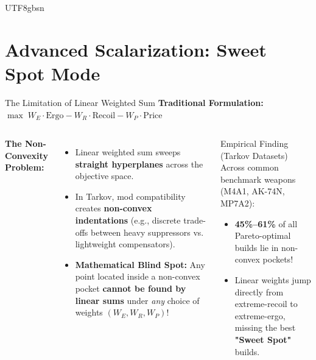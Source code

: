 \documentclass[aspectratio=169]{beamer}
\begin{document}
\begin{CJK*}{UTF8}{gbsn}


\section{Advanced Scalarization: Sweet Spot Mode}

\begin{frame}{The Limitation of Linear Weighted Sum}
    \textbf{Traditional Formulation:} $\max \; W_E \cdot \text{Ergo} - W_R \cdot \text{Recoil} - W_P \cdot \text{Price}$
    
    \vspace{0.3cm}
    \begin{columns}
        \textbf{The Non-Convexity Problem:}
        \begin{itemize}
            \item Linear weighted sum sweeps \textbf{straight hyperplanes} across the objective space.
            \item In Tarkov, mod compatibility creates \textbf{non-convex indentations} (e.g., discrete trade-offs between heavy suppressors vs. lightweight compensators).
            \item \textbf{Mathematical Blind Spot:} Any point located inside a non-convex pocket \textbf{cannot be found by linear sums} under \textit{any} choice of weights $(W_E, W_R, W_P)$!
        \end{itemize}

        \begin{block}{Empirical Finding (Tarkov Datasets)}
            Across common benchmark weapons (M4A1, AK-74N, MP7A2):
            \begin{itemize}
                \item \textbf{45\%--61\%} of all Pareto-optimal builds lie in non-convex pockets!
                \item Linear weights jump directly from extreme-recoil to extreme-ergo, missing the best \textbf{"Sweet Spot"} builds.
            \end{itemize}
        \end{block}
    \end{columns}
\end{frame}


\end{CJK*}
\end{document}
